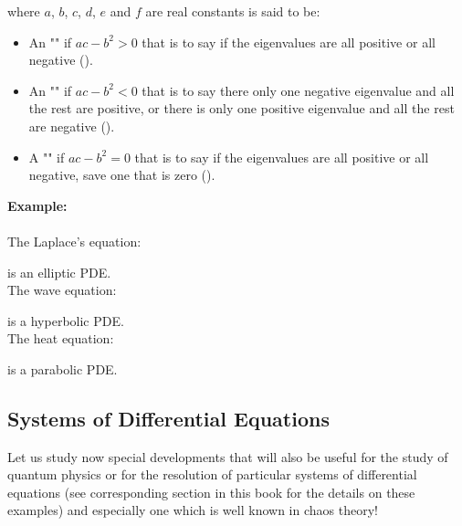	where $a$, $b$, $c$, $d$, $e$ and $f$ are real constants is said to be:
	\begin{itemize}
		\item An "" if $ac-b^2>0$ that is to say if the eigenvalues are all positive or all negative ().

		\item An "" if $ac-b^2<0$ that is to say there only one negative eigenvalue and all the rest are positive, or there is only one positive eigenvalue and all the rest are negative ().

		\item A "\label{parabolic partial differential equation}" if $ac-b^2=0$ that is to say if the eigenvalues are all positive or all negative, save one that is zero ().
	\end{itemize}

	\begin{tcolorbox}[colframe=black,colback=white,sharp corners]
	\textbf{{\Large {}}Example:}\\\\
	The Laplace's equation:
	
	is an elliptic PDE.\\

	The wave equation:
	
	is a hyperbolic PDE.\\

	The heat equation:
	
	is a parabolic PDE.
	\end{tcolorbox}
	
	\pagebreak
	\subsection{Systems of Differential Equations}
	Let us study now special developments that will also be useful for the study of quantum physics or for the resolution of particular systems of differential equations (see corresponding section in this book for the details on these examples) and especially one which is well known in chaos theory!
	
